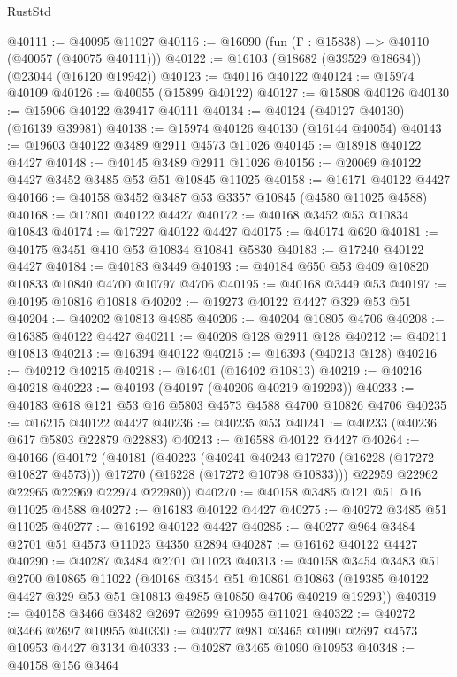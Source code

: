 \begin{lexlean}{RustStd}
\begin{coremodule}
@40111 := @40095 @11027
@40116 := @16090 (fun (Γ : @15838) => @40110 (@40057 (@40075 @40111)))
@40122 := @16103 (@18682 (@39529 @18684)) (@23044 (@16120 @19942))
@40123 := @40116 @40122
@40124 := @15974 @40109
@40126 := @40055 (@15899 @40122)
@40127 := @15808 @40126
@40130 := @15906 @40122 @39417 @40111
@40134 := @40124 (@40127 @40130) (@16139 @39981)
@40138 := @15974 @40126 @40130 (@16144 @40054)
@40143 := @19603 @40122 @3489 @2911 @4573 @11026
@40145 := @18918 @40122 @4427
@40148 := @40145 @3489 @2911 @11026
@40156 := @20069 @40122 @4427 @3452 @3485 @53 @51 @10845 @11025
@40158 := @16171 @40122 @4427
@40166 := @40158 @3452 @3487 @53 @3357 @10845 (@4580 @11025 @4588)
@40168 := @17801 @40122 @4427
@40172 := @40168 @3452 @53 @10834 @10843
@40174 := @17227 @40122 @4427
@40175 := @40174 @620
@40181 := @40175 @3451 @410 @53 @10834 @10841 @5830
@40183 := @17240 @40122 @4427
@40184 := @40183 @3449
@40193 := @40184 @650 @53 @409 @10820 @10833 @10840 @4700 @10797 @4706
@40195 := @40168 @3449 @53
@40197 := @40195 @10816 @10818
@40202 := @19273 @40122 @4427 @329 @53 @51
@40204 := @40202 @10813 @4985
@40206 := @40204 @10805 @4706
@40208 := @16385 @40122 @4427
@40211 := @40208 @128 @2911 @128
@40212 := @40211 @10813
@40213 := @16394 @40122
@40215 := @16393 (@40213 @128)
@40216 := @40212 @40215
@40218 := @16401 (@16402 @10813)
@40219 := @40216 @40218
@40223 := @40193 (@40197 (@40206 @40219 @19293))
@40233 := @40183 @618 @121 @53 @16 @5803 @4573 @4588 @4700 @10826 @4706
@40235 := @16215 @40122 @4427
@40236 := @40235 @53
@40241 := @40233 (@40236 @617 @5803 @22879 @22883)
@40243 := @16588 @40122 @4427
@40264 := @40166
    (@40172
      (@40181
        (@40223
          (@40241 @40243 @17270 (@16228 (@17272 @10827 @4573)))
          @17270
          (@16228 (@17272 @10798 @10833)))
        @22959
        @22962
        @22965
        @22969
        @22974
        @22980))
@40270 := @40158 @3485 @121 @51 @16 @11025 @4588
@40272 := @16183 @40122 @4427
@40275 := @40272 @3485 @51 @11025
@40277 := @16192 @40122 @4427
@40285 := @40277 @964 @3484 @2701 @51 @4573 @11023 @4350 @2894
@40287 := @16162 @40122 @4427
@40290 := @40287 @3484 @2701 @11023
@40313 := @40158
    @3454
    @3483
    @51
    @2700
    @10865
    @11022
    (@40168
      @3454
      @51
      @10861
      @10863
      (@19385 @40122 @4427 @329 @53 @51 @10813 @4985 @10850 @4706 @40219 @19293))
@40319 := @40158 @3466 @3482 @2697 @2699 @10955 @11021
@40322 := @40272 @3466 @2697 @10955
@40330 := @40277 @981 @3465 @1090 @2697 @4573 @10953 @4427 @3134
@40333 := @40287 @3465 @1090 @10953
@40348 := @40158
    @156
    @3464

\end{coremodule}
\end{lexlean}
